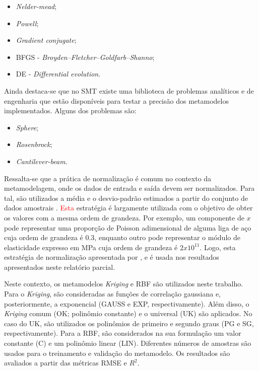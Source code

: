 \begin{itemize}

	\item \textit{{\color{red}Nelder-mead}};

	\item \textit{Powell};

	\item \textit{Gradient conjugate};

	\item BFGS - \textit{Broyden–Fletcher–Goldfarb–Shanno};

	\item DE - \textit{Differential evolution}.

\end{itemize}

Ainda destaca-se que no SMT existe uma biblioteca de problemas analíticos e de engenharia que estão disponíveis para testar a precisão dos metamodelos implementados. Alguns dos problemas são:

\begin{itemize}
	\item \textit{Sphere};
	\item \textit{Rosenbrock};
	\item \textit{Cantilever-beam}.
\end{itemize}

Ressalta-se que a prática de normalização é comum no contexto da metamodelagem, onde os dados de entrada e saída devem ser normalizados. Para tal, são utilizados a média e o desvio-padrão estimados a partir do conjunto de dados amostrais \cite{SICCHIERI2019}. \textcolor{red}{Esta} estratégia é largamente utilizada com o objetivo de obter os valores com a mesma ordem de grandeza. Por exemplo, um componente de $x$ pode representar uma proporção de Poisson adimensional de alguma liga de aço cuja ordem de grandeza é $0.3$, enquanto outro pode representar o módulo de elasticidade expresso em MPa cuja ordem de grandeza é $2 x 10^{11}$. Logo, esta estratégia de normalização apresentada por ,  e  é usada nos resultados apresentados neste relatório parcial.

Neste contexto, os metamodelos {\it Kriging} e RBF são utilizados neste trabalho. Para o \textit{Kriging}, são consideradas as funções de correlação gaussiana e, posteriormente, a exponencial (GAUSS e EXP, respectivamente). Além disso, o {\it Kriging} comum (OK; polinômio constante) e o universal (UK) são aplicados. No caso do UK, são utilizados os polinômios de primeiro e segundo graus (PG e SG, respectivamente). Para a RBF, são considerados na sua formulação um valor constante (C) e um polinômio linear (LIN). Diferentes números de amostras são usados para o treinamento e validação do metamodelo. Os resultados são avaliados a partir das métricas RMSE e $R^2$.

